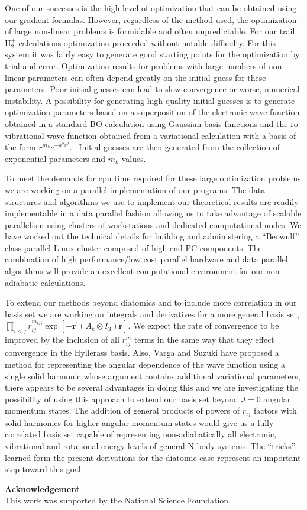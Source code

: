 \documentclass[12pt]{article}
\newtheorem{acknowledgement}[theorem]{Acknowledgement}
\begin{document}
One of our successes is the high level of optimization that can be obtained
using our gradient formulas. However, regardless of the method used, the
optimization of large non-linear problems is formidable and often
unpredictable. For our trail H$_{2}^{+}$ calculations optimization proceeded
without notable difficulty. For this system it was fairly easy to generate
good starting points for the optimization by trial and error. Optimization
results for problems with large numbers of non-linear parameters can often
depend greatly on the initial guess for these parameters. Poor initial guesses
can lead to slow convergence or worse, numerical instability. A possibility
for generating high quality initial guesses is to generate optimization
parameters based on a superposition of the electronic wave function obtained
in a standard BO calculation using Gaussian basis functions and the
ro--vibrational wave function obtained from a variational calculation with a
basis of the form\cite{Kinghorn97b} $r^{m_{k}}e^{-a^{2}r^{2}}$. \ Initial
guesses are then generated from the collection of exponential parameters and
$m_{k}$ values.

To meet the demands for cpu time required for these large optimization
problems we are working on a parallel implementation of our programs. The data
structures and algorithms we use to implement our theoretical results are
readily implementable in a data parallel fashion allowing us to take advantage
of scalable parallelism using clusters of workstations and dedicated
computational nodes. We have worked out the technical details for building and
administering a ``Beowulf''\cite{beowulfwww} class parallel Linux cluster
composed of high end PC components. The combination of high performance/low
cost parallel hardware and data parallel algorithms will provide an excellent
computational environment for our non-adiabatic calculations.

To extend our methods beyond diatomics and to include more correlation in our
basis set we are working on integrals and derivatives for a more general basis
set, $\prod_{i<j}r_{ij}^{m_{kij}}\exp\left[  -\mathbf{r}^{\prime}(A_{k}\otimes
I_{3})\mathbf{r}\right]  .$ We expect the rate of convergence to be improved
by the inclusion of all $r_{ij}^{m}$ terms in the same way that they effect
convergence in the Hyllerass basis. Also, Varga and Suzuki\cite{Varga95} have
proposed a method for representing the angular dependence of the wave function
using a single solid harmonic whose argument contains additional variational
parameters, there appears to be several advantages in doing this and we are
investigating the possibility of using this approach to extend our basis set
beyond $J=0$ angular momentum states. The addition of general products of
powers of $r_{ij}$ factors with solid harmonics for higher angular momentum
states would give us a fully correlated basis set capable of representing
non-adiabatically all electronic, vibrational and rotational energy levels of
general N-body systems. The ``tricks'' learned form the present derivations
for the diatomic case represent an important step toward this goal.

\vspace{.25in}
\noindent
\large{\bf{Acknowledgement}} \normalsize \\
This work was supported by the National Science Foundation.



\end{document}
